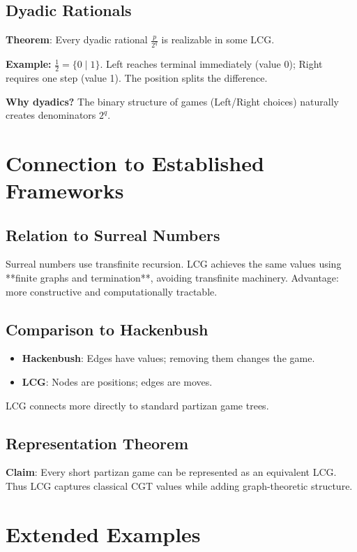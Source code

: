 \documentclass[10pt,a4paper,twocolumn]{article}
\theoremstyle{plain}
\theoremstyle{definition}
\theoremstyle{remark}
\begin{document}
\subsection{Dyadic Rationals}

\textbf{Theorem}: Every dyadic rational $\frac{p}{2^q}$ is realizable in some LCG.

\textbf{Example:} $\frac{1}{2} = \{0 \mid 1\}$. Left reaches terminal immediately (value 0); Right requires one step (value 1). The position splits the difference.

\textbf{Why dyadics?} The binary structure of games (Left/Right choices) naturally creates denominators $2^q$.

\section{Connection to Established Frameworks}

\subsection{Relation to Surreal Numbers}

Surreal numbers use transfinite recursion. LCG achieves the same values using **finite graphs and termination**, avoiding transfinite machinery. Advantage: more constructive and computationally tractable.

\subsection{Comparison to Hackenbush}

\begin{itemize}
\item \textbf{Hackenbush}: Edges have values; removing them changes the game.
\item \textbf{LCG}: Nodes are positions; edges are moves.
\end{itemize}

LCG connects more directly to standard partizan game trees.

\subsection{Representation Theorem}

\textbf{Claim}: Every short partizan game can be represented as an equivalent LCG. Thus LCG captures classical CGT values while adding graph-theoretic structure.

\section{Extended Examples}
\end{document}

